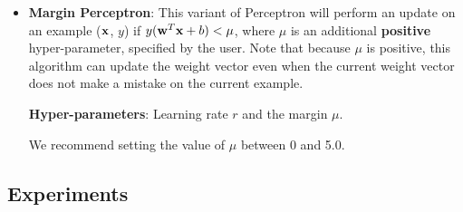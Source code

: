 \begin{itemize}
\item {\bf Margin Perceptron}: This variant of Perceptron will perform
  an update on an example (${\bf x}$, $y$) if $y ({\bf w}^T{\bf x} + b) < \mu$,
  where $\mu$ is an additional {\bf positive} hyper-parameter,
  specified by the user. Note that because $\mu$ is positive, this
  algorithm can update the weight vector even when the current weight
  vector does not make a mistake on the current example.

  {\bf Hyper-parameters}: Learning rate $r$ and the margin $\mu$. 

  We recommend setting the value of $\mu$ between 0 and 5.0.
  
\end{itemize}

\subsection{Experiments}

